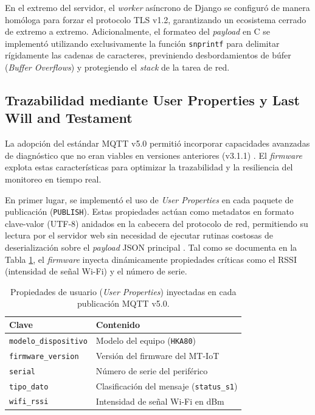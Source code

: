 \par En el extremo del servidor, el \textit{worker} asíncrono de Django se configuró de manera homóloga para forzar el protocolo TLS v1.2, garantizando un ecosistema cerrado de extremo a extremo. Adicionalmente, el formateo del \textit{payload} en C se implementó utilizando exclusivamente la función \texttt{snprintf} para delimitar rígidamente las cadenas de caracteres, previniendo desbordamientos de búfer (\textit{Buffer Overflows}) y protegiendo el \textit{stack} de la tarea de red.

\subsection{Trazabilidad mediante User Properties y Last Will and Testament}

\par La adopción del estándar MQTT v5.0 permitió incorporar capacidades avanzadas de diagnóstico que no eran viables en versiones anteriores (v3.1.1) \cite{OASIS_MQTT_v5}. El \textit{firmware} explota estas características para optimizar la trazabilidad y la resiliencia del monitoreo en tiempo real.\\

\par En primer lugar, se implementó el uso de \textit{User Properties} en cada paquete de publicación (\texttt{PUBLISH}). Estas propiedades actúan como metadatos en formato clave-valor (UTF-8) anidados en la cabecera del protocolo de red, permitiendo su lectura por el servidor web sin necesidad de ejecutar rutinas costosas de deserialización sobre el \textit{payload} JSON principal \cite{OASIS_MQTT_v5}. Tal como se documenta en la Tabla \ref{tab:user_props}, el \textit{firmware} inyecta dinámicamente propiedades críticas como el RSSI (intensidad de señal Wi-Fi) y el número de serie.\\

\begin{table}[htbp]
\centering
\caption{Propiedades de usuario (\textit{User Properties}) inyectadas en cada publicación MQTT v5.0.}
\label{tab:user_props}
\begin{tabularx}{\textwidth}{@{}l >{\raggedright\arraybackslash}X@{}}
\toprule
\textbf{Clave} & \textbf{Contenido} \\
\midrule
\texttt{modelo\_dispositivo} & Modelo del equipo (\texttt{HKA80}) \\
\texttt{firmware\_version} & Versión del firmware del MT-IoT \\
\texttt{serial} & Número de serie del periférico \\
\texttt{tipo\_dato} & Clasificación del mensaje (\texttt{status\_s1}) \\
\texttt{wifi\_rssi} & Intensidad de señal Wi-Fi en dBm \\
\bottomrule
\end{tabularx}
\end{table}

